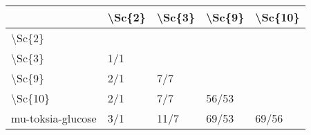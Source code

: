 \begin{tabular}{lllll}
\toprule
{} & \textbackslash Sc\{2\} & \textbackslash Sc\{3\} & \textbackslash Sc\{9\} & \textbackslash Sc\{10\} \\
\midrule
\textbackslash Sc\{2\}            &        &        &        &         \\
\textbackslash Sc\{3\}            &    1/1 &        &        &         \\
\textbackslash Sc\{9\}            &    2/1 &    7/7 &        &         \\
\textbackslash Sc\{10\}           &    2/1 &    7/7 &  56/53 &         \\
mu-toksia-glucose &    3/1 &   11/7 &  69/53 &   69/56 \\
\bottomrule
\end{tabular}
